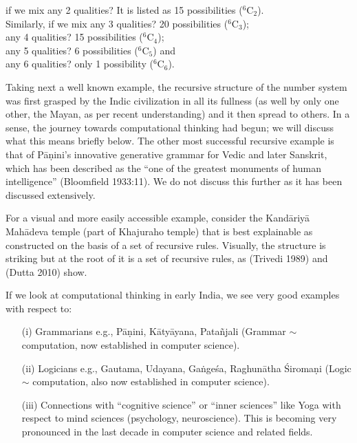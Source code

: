 {if we mix any 2 qualities? It is listed as 15 possibilities ($^{6}$C$_{2}$).\\[2pt]
Similarly, if we mix any 3 qualities? 20 possibilities ($^{6}$C$_{3}$);\\[2pt]
any 4 qualities? 15 possibilities ($^{6}$C$_{4}$);\\[2pt]
any 5 qualities? 6 possibilities ($^{6}$C$_{5}$) and\\[2pt]
any 6 qualities? only 1 possibility ($^{6}$C$_{6}$).


Taking next a well known example, the recursive structure of the number system was first grasped by the Indic civilization in all its fullness (as well by only one other, the Mayan, as per recent understanding) and it then spread to others. In a sense, the journey towards computational thinking had begun; we will discuss what this means briefly below. The other most successful recursive example is that of Pāṇini’s innovative generative grammar for Vedic and later Sanskrit, which has been described as the “one of the greatest monuments of human intelligence” (Bloomfield 1933:11). We do not discuss this further as it has been discussed extensively.

For a visual and more easily accessible example, consider the Kandāriyā Mahādeva temple (part of Khajuraho temple) that is best explainable as constructed on the basis of a set of recursive rules. Visually, the structure is striking but at the root of it is a set of recursive rules, as (Trivedi 1989) and (Dutta 2010) show.

If we look at computational thinking in early India, we see very good examples with respect to:
\begin{itemize}
\itemsep=2pt
\item[(i)] Grammarians e.g., Pāṇini, Kātyāyana, Patañjali (Grammar $\sim$ computation, now established in computer science).

\item[(ii)] Logicians e.g., Gautama, Udayana, Gaṅgeśa, Raghunātha Śiromaṇi (Logic $\sim$ computation, also now established in computer science).

\item[(iii)] Connections with “cognitive science” or “inner sciences” like Yoga with respect to mind sciences (psychology, neuroscience). This is becoming very pronounced in the last decade in computer science and related fields.
\end{itemize}

}
